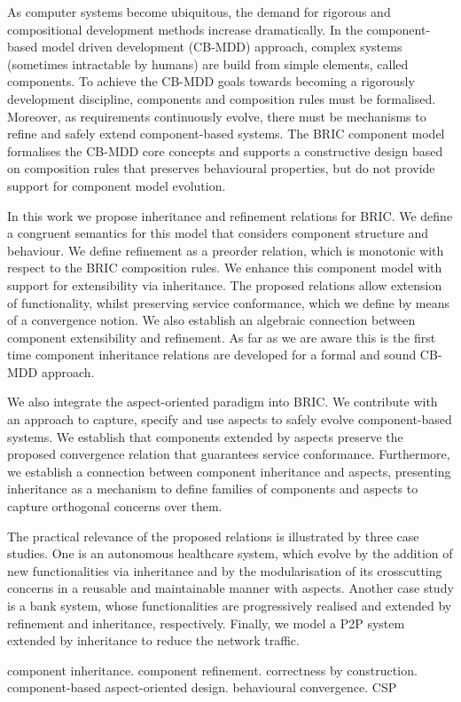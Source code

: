 
As computer systems become ubiquitous, the demand for rigorous and compositional development methods increase dramatically. In the component-based model driven development (CB-MDD) approach, complex systems (sometimes intractable by humans) are build from simple elements, called components. To achieve the CB-MDD goals towards becoming a rigorously development discipline, components and composition rules must be formalised. Moreover, as requirements continuously evolve, there must be mechanisms to refine and safely extend component-based systems. The BRIC component model formalises the CB-MDD core concepts and supports a constructive design based on composition rules that preserves behavioural properties, but do not provide support for component model evolution. 

In this work we propose inheritance and refinement relations for BRIC. We define a congruent semantics for this model that considers component structure and behaviour. We define refinement as a preorder relation, which is monotonic with respect to the BRIC composition rules. We enhance this component model with support for extensibility via inheritance. The proposed relations allow extension of functionality, whilst preserving service conformance, which we define by means of a convergence notion. We also establish an algebraic connection between component extensibility and refinement. As far as we are aware this is the first time component inheritance relations are developed for a formal and sound CB-MDD approach.

We also integrate the aspect-oriented paradigm into BRIC. We contribute with an approach to capture, specify and use aspects to safely evolve component-based systems. We establish that components extended by aspects preserve the proposed convergence relation that guarantees service conformance. Furthermore, we establish a connection between component inheritance and aspects, presenting inheritance as a mechanism to define families of components and aspects to capture orthogonal concerns over them.

The practical relevance of the proposed relations is illustrated by three case studies. One is an autonomous healthcare system, which evolve by the addition of new functionalities via inheritance and by the modularisation of its crosscutting concerns in a reusable and maintainable manner with aspects. Another case study is a bank system, whose functionalities are progressively realised and extended by refinement and inheritance, respectively. Finally, we model a P2P system extended by inheritance to reduce the network traffic.

\begin{keywords}
component inheritance. component refinement. correctness by construction. component-based aspect-oriented design. behavioural convergence. CSP
\end{keywords}
